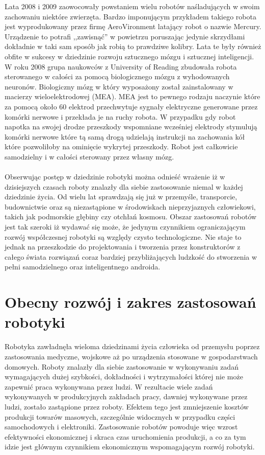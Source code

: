 Lata 2008 i 2009 zaowocowały powstaniem wielu robotów naśladujących w swoim
zachowaniu niektóre zwierzęta. Bardzo imponującym przykładem takiego robota jest
wyprodukowany przez firmę AeroVironment latający robot o nazwie Mercury.
Urządzenie to potrafi ,,zawisnąć'' w powietrzu poruszając jedynie skrzydłami
dokładnie w taki sam sposób jak robią to prawdziwe kolibry. Lata te były również
obfite w sukcesy w dziedzinie rozwoju sztucznego mózgu i sztucznej inteligencji.
W roku 2008 grupa naukowców z University of Reading zbudowała robota sterowanego w całości za
pomocą biologicznego mózgu z wyhodowanych neuronów. Biologiczny mózg w który wyposażony
został zainstalowany w macierzy wieloelektrodowej (MEA). MEA jest to pewnego
rodzaju naczynie które za pomocą około 60 elektrod przechwytuje sygnały
elektryczne generowane przez komórki nerwowe i przekłada je na ruchy robota. W
przypadku gdy robot napotka na swojej drodze przeszkody wspomniane
wcześniej elektrody stymulują komórki nerwowe które tą samą drogą udzielają
instrukcji na zachowania kół które pozwoliłoby na ominięcie wykrytej przeszkody. Robot jest
całkowicie samodzielny i w całości sterowany przez własny mózg.\\
\\
Obserwując postęp w dziedzinie robotyki można odnieść wrażenie iż w dzisiejszych
czasach roboty znalazły dla siebie zastosowanie niemal w każdej dziedzinie życia.
Od wielu lat sprawdzają się już w przemyśle, transporcie, budownictwie oraz są
niezastąpione w środowiskach nieprzyjaznych człowiekowi, takich jak podmorskie
głębiny czy otchłań kosmosu. Obszar zastosowań robotów jest tak szeroki iż
wydawać się może, że jedynym czynnikiem ograniczającym rozwój współczesnej
robotyki są względy czysto technologiczne. Nie staje to jednak na przeszkodzie do
projektowania i tworzenia przez konstruktorów z całego świata rozwiązań coraz
bardziej przybliżających ludzkość do stworzenia w pełni samodzielnego oraz
inteligentnego androida.
\section{Obecny rozwój i zakres zastosowań robotyki}
Robotyka zawładnęła wieloma dziedzinami życia człowieka od przemysłu poprzez
zastosowania medyczne, wojskowe aż po urządzenia stosowane w gospodarstwach
domowych. Roboty znalazły dla siebie zastosowanie w wykonywaniu zadań
wymagających dużej szybkości, dokładności i wytrzymałości której nie może
zapewnić praca wykonywana przez ludzi. W rezultacie wiele zadań wykonywanych w
produkcyjnych zakładach pracy, dawniej wykonywane przez ludzi, zostało zastąpione
przez roboty. Efektem tego jest zmniejszenie kosztów produkcji towarów masowych,
szczególnie widocznych w przypadku części samochodowych i elektroniki.
Zastosowanie robotów powoduje więc wzrost efektywności ekonomicznej i skraca czas
uruchomienia produkcji, a co za tym idzie jest głównym czynnikiem ekonomicznym wspomagającym rozwój robotyki.

